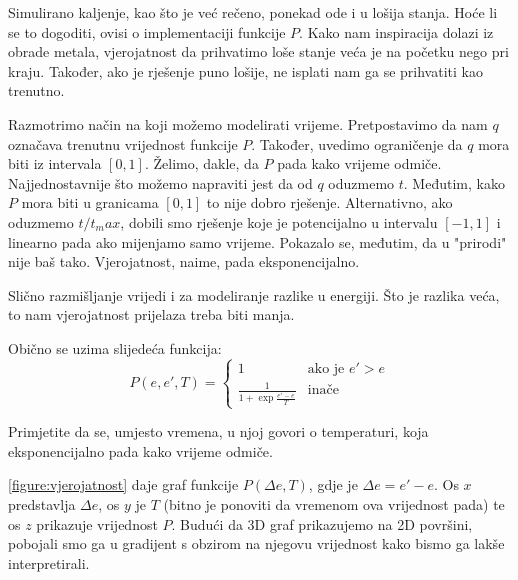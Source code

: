 \documentclass[times, utf8, zavrsni]{fer}
\begin{document}
Simulirano kaljenje, kao što je već rečeno, ponekad ode i u lošija
stanja. Hoće li se to dogoditi, ovisi o implementaciji funkcije
$P$. Kako nam inspiracija dolazi iz obrade metala, vjerojatnost da
prihvatimo loše stanje veća je na početku nego pri kraju. Također,
ako je rješenje puno lošije, ne isplati nam ga se prihvatiti kao
trenutno. 

Razmotrimo način na koji možemo modelirati vrijeme. Pretpostavimo
da nam $q$ označava trenutnu vrijednost funkcije $P$. Također,
uvedimo ograničenje da $q$ mora biti iz intervala $[0, 1]$.
Želimo, dakle, da $P$ pada kako vrijeme odmiče. Najjednostavnije
što možemo napraviti jest da od $q$ oduzmemo $t$. Međutim,
kako $P$ mora biti u granicama $[0, 1]$ to nije dobro rješenje.
Alternativno, ako oduzmemo $t/t_max$, dobili smo rješenje koje
je potencijalno u intervalu $[-1, 1]$ i linearno pada
ako mijenjamo samo vrijeme. Pokazalo se, međutim, da u "prirodi"
nije baš tako. Vjerojatnost, naime, pada eksponencijalno. 

Slično razmišljanje vrijedi i za modeliranje razlike u energiji.
Što je razlika veća, to nam vjerojatnost prijelaza treba biti manja.

Obično se uzima slijedeća funkcija: 
$$
P(e, e', T) = 
\left\{ \begin{array}{ll}
	1 & \mbox{ako je } e' > e \\
	\frac{1}{1+\exp \frac{e'-e}{T}} & \mbox{inače}
\end{array} \right.
$$

Primjetite da se, umjesto vremena, u njoj govori o temperaturi,
koja eksponencijalno pada kako vrijeme odmiče. 

\autoref{figure:vjerojatnost} daje graf funkcije $P(\Delta e, T)$, gdje
je $\Delta e = e'-e$. Os
$x$ predstavlja $\Delta e$, os $y$ je $T$ (bitno je ponoviti da
vremenom ova vrijednost pada) te os $z$ prikazuje vrijednost $P$. 
Budući da 3D graf prikazujemo na 2D površini, pobojali smo ga
u gradijent s obzirom na njegovu vrijednost kako bismo ga lakše 
interpretirali. 
\end{document}
